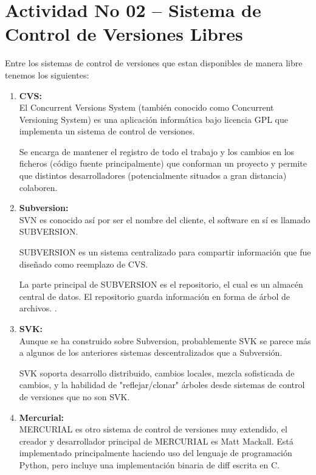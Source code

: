\section{Actividad No 02 – Sistema de Control de Versiones Libres} 
Entre los sistemas de control de versiones que estan disponibles de manera libre tenemos los siguientes:

\begin{enumerate}[1.]

\item \textbf{CVS:} \\

El Concurrent Versions System (también conocido como Concurrent Versioning System) es una aplicación informática bajo licencia GPL que implementa un sistema de control de versiones.

Se encarga de mantener el registro de todo el trabajo y los cambios en los ficheros (código fuente principalmente) que conforman un proyecto y permite que distintos desarrolladores (potencialmente situados a gran distancia) colaboren.\\

\item \textbf{Subversion:} \\

SVN es conocido así por ser el nombre del cliente, el software en sí es llamado SUBVERSION.

SUBVERSION es un sistema centralizado para compartir información que fue diseñado como reemplazo de CVS.

La parte principal de SUBVERSION es el repositorio, el cual es un almacén central de datos. El repositorio guarda información en forma de árbol de archivos. .\\

\item \textbf{SVK:} \\

Aunque se ha construido sobre Subversion, probablemente SVK se parece más a algunos de los anteriores sistemas descentralizados que a Subversión. 

SVK soporta desarrollo distribuido, cambios locales, mezcla sofisticada de cambios, y la habilidad de "reflejar/clonar" árboles desde sistemas de control de versiones que no son SVK.\\

\item \textbf{Mercurial:} \\

MERCURIAL es otro sistema de control de versiones muy extendido, el creador y desarrollador principal de MERCURIAL es Matt Mackall. Está implementado principalmente haciendo uso del lenguaje de programación Python, pero incluye una implementación binaria de diff escrita en C.\\


\end{enumerate}
